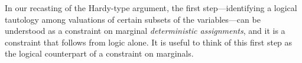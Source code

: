 \documentclass[aps,english,superscriptaddress,onecolumn,twoside,longbibliography,pra,floatfix,fleqn,nofootinbib]{revtex4-1}%
\theoremstyle{definition}
\begin{document}

In our recasting of the Hardy-type argument, the first step---identifying a logical tautology among valuations of certain subsets of the variables---can be understood as a constraint on marginal {\em deterministic assignments}, and it is a constraint that follows from logic alone.  
It is useful to think of this first step as the logical counterpart of a constraint on marginals. 




\end{document}
